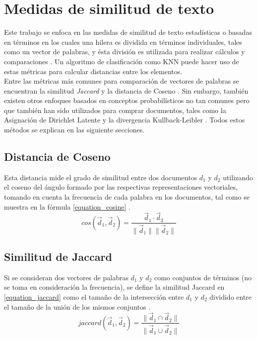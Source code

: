 \section{Medidas de similitud de texto}
Este trabajo se enfoca en las medidas de similitud de texto estadísticas o basadas en términos en los cuales una hilera es dividida en términos individuales, tales como un vector de palabras, y ésta división es utilizada para realizar cálculos y comparaciones \cite{wang2016non}. Un algoritmo de clasificación como KNN puede hacer uso de estas métricas para calcular distancias entre los elementos.\\
Entre las métricas más comunes para comparación de vectores de palabras se encuentran la similitud \textit{Jaccard} y la distancia de Coseno \cite{soto2015similarity,wang2016non}. Sin embargo, también existen otros enfoques basados en conceptos probabilísticos no tan comunes pero que también han sido utilizados para comprar documentos, tales como la Asignación de Dirichlet Latente y la divergencia Kullback-Leibler \cite{bae2014computing,metzler2007similarity}. Todos estos métodos se explican en las siguiente secciones.
\subsection{Distancia de Coseno}
Esta distancia mide el grado de similitud entre dos documentos ${d_{1}}$ y ${d_{2}}$ utilizando el coseno del ángulo formado por las respectivas representaciones vectoriales, tomando en cuenta la frecuencia de cada palabra en los documentos, tal como se muestra en la fórmula \ref{equation_cosine} \cite{soto2015similarity}.
\begin{equation}
\label{equation_cosine}
cos(\vec{d}_{1},\vec{d}_{2})=\frac{\vec{d}_{1}\cdot\vec{d}_{2}}{\parallel \vec{d}_{1}\parallel \parallel \vec{d}_{2} \parallel }
\end{equation}
\subsection{Similitud de Jaccard}
Si se consideran dos vectores de palabras ${d_{1}}$ y ${d_{2}}$ como conjuntos de términos (no se toma en consideración la frecuencia), se define la similitud Jaccard en \ref{equation_jaccard} como el tamaño de la intersección entre  ${d_{1}}$ y ${d_{2}}$ dividido entre el tamaño de la unión de los mismos conjuntos \cite{aggarwal2015data}. 
\begin{equation}
\label{equation_jaccard}
jaccard(\vec{d}_{1},\vec{d}_{2}) = \frac{\parallel\vec{d}_{1}\cap \vec{d}_{2}\parallel}{\parallel\vec{d}_{1}\cup \vec{d}_{2}\parallel}
\end{equation}

